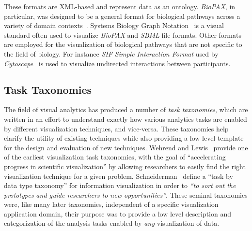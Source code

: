 \documentclass{egpubl}
\begin{document}
These formats are XML-based and represent data as an ontology.
\emph{BioPAX}, in particular, was designed to be a general format for biological pathways across a variety of domain contexts~\cite{demir2010biopax}.
Systems Biology Graph Notation~\cite{Novere2009} is a visual standard often used to visualize \textit{BioPAX} and \textit{SBML} file formats.
Other formats are employed for the visualization of biological pathways that are not specific to the field of biology.
For instance \textit{SIF Simple Interaction Format} used by \textit{Cytoscape}~\cite{Shannon2003cytoscape} is used to visualize undirected interactions between participants.




\subsection{Task Taxonomies}
The field of visual analytics has produced a number of \textit{task taxonomies}, which are written in an effort to understand exactly how various analytics tasks are enabled by different visualization techniques, and vice-versa.
These taxonomies help clarify the utility of existing techniques while also providing a low level template for the design and evaluation of new techniques.
Wehrend and Lewis~\cite{Wehrend1990} provide one of the earliest visualization task taxonomies, with the goal of ``accelerating progress in scientific visualization'' by allowing researchers to easily find the right visualization technique for a given problem.
Schneiderman~\cite{Shneiderman1996} define a ``task by data type taxonomy'' for information visualization in order to \textit{``to sort out the prototypes and guide researchers to new opportunities''}.
These seminal taxonomies were, like many later taxonomies, independent of a specific visualization application domain, their purpose was to provide a low level description and categorization of the analysis tasks enabled by \textit{any} visualization of data.
\end{document}
